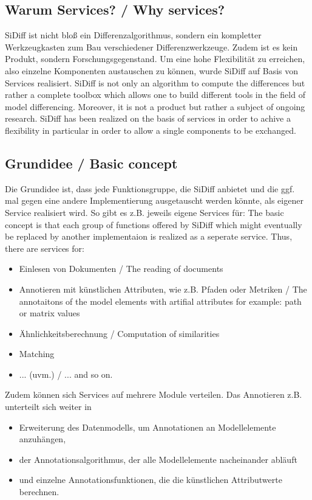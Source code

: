 \documentclass[10pt,a4paper]{scrartcl}
\providecommand{\deng}[2]{#1 / {\sffamily #2}}
\providecommand{\deutsch}[1]{#1}
\providecommand{\englisch}[1]{{\sffamily #1}}
\begin{document}
\subsection{\deng{Warum Services?}{Why services?}}
\deutsch{SiDiff ist nicht bloß ein Differenzalgorithmus, sondern ein kompletter
Werkzeugkasten zum Bau verschiedener Differenzwerkzeuge. Zudem ist es kein
Produkt, sondern Forschungsgegenstand. Um eine hohe Flexibilität zu erreichen,
also einzelne Komponenten austauschen zu können, wurde SiDiff auf Basis von
Services realisiert.}
\englisch{SiDiff is not only an algorithm to compute the differences but rather
a complete toolbox which allows one to build different tools in the field of
model differencing. Moreover, it is not a product but rather a subject of
ongoing research. SiDiff has been realized on the basis of services in order to
achive a flexibility in particular in order to allow a single components to be
exchanged.}

\subsection{\deng{Grundidee}{Basic concept}}
\deutsch{Die Grundidee ist, dass jede Funktionsgruppe, die SiDiff anbietet und die ggf.
mal gegen eine andere Implementierung ausgetauscht werden könnte, als eigener
Service realisiert wird. So gibt es z.B. jeweils eigene Services für:}
\englisch{The basic concept is that each group of functions offered by SiDiff
which might eventually be replaced by another implementaion is realized as a
seperate service. Thus, there are services for:}

\begin{itemize}
 \item \deng{Einlesen von Dokumenten}{The reading of documents}
 \item \deng{Annotieren mit künstlichen Attributen, wie z.B. Pfaden oder Metriken}{The annotaitons of the model elements with artifial attributes for example: path or matrix values}
 \item \deng{Ähnlichkeitsberechnung}{Computation of similarities}
 \item Matching
 \item \deng{... (uvm.)}{... and so on.}
\end{itemize}

\deutsch{Zudem können sich Services auf mehrere Module verteilen. 
Das Annotieren z.B. unterteilt sich weiter in
\begin{itemize}
 \item Erweiterung des Datenmodells, um Annotationen an Modellelemente anzuhängen,
 \item der Annotationsalgorithmus, der alle Modellelemente nacheinander abläuft
 \item und einzelne Annotationsfunktionen, die die künstlichen Attributwerte berechnen.
\end{itemize}}
\end{document}
